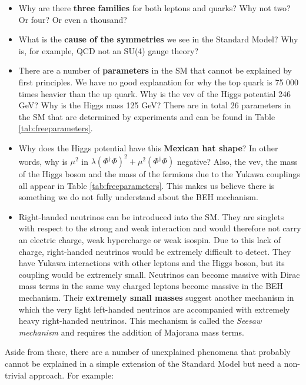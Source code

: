 \begin{itemize}
\item Why are there \textbf{three families} for both leptons and quarks? Why  not two? Or four? Or even a thousand?
\item What is the \textbf{cause of the symmetries} we see in the Standard Model? Why is, for example, QCD not an SU(4) gauge theory?
\item There are a number of \textbf{parameters} in the SM that cannot be explained by first principles. We have no good explanation for why the top quark is 75 000 times heavier than the up quark. Why is the vev of the Higgs potential 246 GeV? Why is the Higgs mass 125 GeV? There are in total 26 parameters in the SM that are determined by experiments and can be found in Table \ref{tab:freeparameters}.
\item Why does the Higgs potential have this\textbf{ Mexican hat shape}? In other words, why is $\mu^2$ in $\lambda \left(\Phi^\dagger \Phi \right)^2 + \mu^2\left(\Phi^\dagger \Phi \right)$ negative? Also, the vev, the mass of the Higgs boson and the mass of the fermions due to the Yukawa couplings all appear in Table \ref{tab:freeparameters}. This makes us believe there is something we do not fully understand about the BEH mechanism. 
\item Right-handed neutrinos can be introduced into the SM. They are singlets with respect to the strong and weak interaction and would therefore not carry an electric charge, weak hypercharge or weak isospin. Due to this lack of charge, right-handed neutrinos would be extremely difficult to detect. They have Yukawa interactions with other leptons and the Higgs boson, but its coupling would be extremely small. Neutrinos can become massive with Dirac mass terms in the same way charged leptons become massive in the BEH mechanism. Their \textbf{extremely small masses} suggest another mechanism in which the very light left-handed neutrinos are accompanied with extremely heavy right-handed neutrinos. This mechanism is called the \textit{Seesaw mechanism} and requires the addition of Majorana mass terms.
\end{itemize}
\vspace{2mm}
\noindent Aside from these, there are a number of unexplained phenomena that probably cannot be explained in a simple extension of the Standard Model but need a non-trivial approach. For example:

\vspace{2mm}

